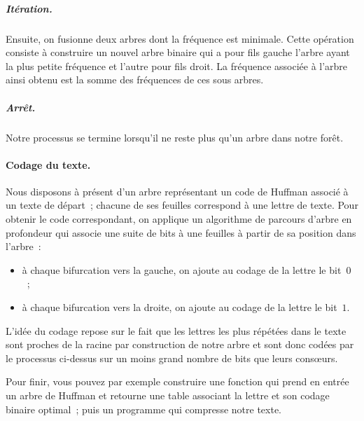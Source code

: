 \begin{exercice}
  \subparagraph{It\'eration.}  Ensuite, on fusionne deux arbres dont
  la fr\'equence est minimale. Cette op\'eration consiste \`a
  construire un nouvel arbre binaire qui a pour fils gauche l'arbre
  ayant la plus petite fr\'equence et l'autre pour fils droit. La
  fr\'equence associ\'ee \`a l'arbre ainsi obtenu est la somme des
  fr\'equences de ces sous arbres.
  
  \subparagraph{Arr\^et.} Notre processus se termine lorsqu'il ne
  reste plus qu'un arbre dans notre for\^et.  

  \paragraph{Codage du texte.} 
  
  Nous disposons \`a pr\'esent d'un arbre repr\'esentant un code de
  Huffman associ\'e \`a un texte de d\'epart~; chacune de ses feuilles
  correspond \`a une lettre de texte. Pour obtenir le code
  correspondant, on applique un algorithme de parcours d'arbre en
  profondeur qui associe une suite de bits \`a une feuilles \`a partir
  de sa position dans l'arbre~:
  \begin{itemize}
  \item \`a chaque bifurcation vers la gauche, on ajoute au codage de
    la lettre le bit~$0$~;
  \item \`a chaque bifurcation vers la droite, on ajoute au codage de
    la lettre le bit~$1$.
  \end{itemize}
  
  L'id\'ee du codage repose sur le fait que les lettres les plus
  r\'ep\'et\'ees dans le texte sont proches de la racine par
  construction de notre arbre et sont donc cod\'ees par le processus
  ci-dessus sur un moins grand nombre de bits que leurs cons\oe{}urs.
  
  Pour finir, vous pouvez par exemple construire une fonction qui
  prend en entr\'ee un arbre de Huffman et retourne une table
  associant la lettre et son codage binaire optimal~; puis un
  programme qui compresse notre texte.
\end{exercice}

